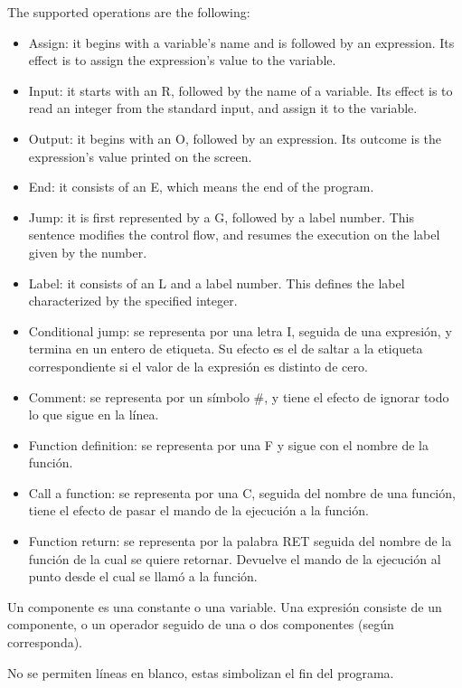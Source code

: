 \documentclass[12pt,spanish]{article}
\begin{document}
\noindent The supported operations are the following:
\begin{itemize}
\item{Assign: it begins with a variable's name and is followed by an expression. Its effect is to assign the expression's value to the variable.}
\item{Input: it starts with an R, followed by the name of a variable. Its effect is to read an integer from the standard input, and assign it to the variable.}
\item{Output: it begins with an O, followed by an expression. Its outcome is the expression's value printed on the screen.}
\item{End: it consists of an E, which means the end of the program.}
\item{Jump: it is first represented by a G, followed by a label number. This sentence modifies the control flow, and resumes the execution on the label given by the number.}
\item{Label: it consists of an L and a label number. This defines the label characterized by the specified integer.}
\item{Conditional jump: se representa por una letra I, seguida de una expresión, y termina en un entero de etiqueta. Su efecto es el de saltar a la etiqueta correspondiente si el valor de la expresión es distinto de cero.}
\item{Comment: se representa por un símbolo \#, y tiene el efecto de ignorar todo lo que sigue en la línea.}
\item{Function definition: se representa por una F y sigue con el nombre de la función.}
\item{Call a function: se representa por una C, seguida del nombre de una función, tiene el efecto de pasar el mando de la ejecución a la función.}
\item{Function return: se representa por la palabra RET seguida del nombre de la función de la cual se quiere retornar. Devuelve el mando de la ejecución al punto desde el cual se llamó a la función.}
\end{itemize}

\noindent Un componente es una constante o una variable. Una expresión consiste de un componente, o un operador seguido de una o dos componentes (según corresponda).

\noindent No se permiten líneas en blanco, estas simbolizan el fin del programa.
\end{document}
